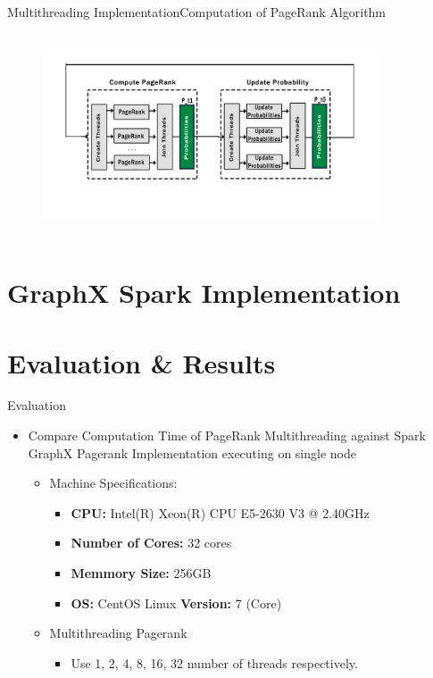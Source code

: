 \documentclass{beamer}
\begin{document}
\begin{frame}{Multithreading Implementation}{Computation of PageRank Algorithm}
    \begin{figure}
        \includegraphics[width=10cm, height=6cm]{implementation2.png}
    \end{figure}
\end{frame}

\section{GraphX Spark Implementation}
\begin{frame}
\end{frame}

\section{Evaluation & Results}
\begin{frame}{Evaluation}
    \begin{itemize}
        \item{Compare Computation Time of PageRank Multithreading against Spark
            GraphX Pagerank Implementation executing on single node}
            \begin{itemize} 
                \item{Machine Specifications:}
                    \begin{itemize}
                        \item{\textbf{CPU:} Intel(R) Xeon(R) CPU E5-2630 V3 @ 2.40GHz} 
                        \item{\textbf{Number of Cores:} 32 cores}
                        \item{\textbf{Memmory Size:} 256GB}
                        \item{\textbf{OS:} CentOS Linux \textbf{Version:} 7 (Core)}
                    \end{itemize}

                \item{Multithreading Pagerank}
                    \begin{itemize}
                        \item{Use 1, 2, 4, 8, 16, 32 number of threads
                    respectively.}
                    \end{itemize}
            \end{itemize}
    \end{itemize}

\end{frame}
\end{document}
